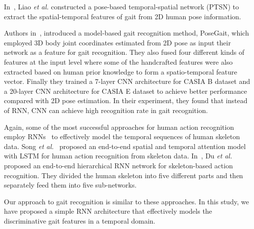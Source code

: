In~\cite{Liao_17}, Liao \textit{et al.} constructed a pose-based temporal-spatial network (PTSN) to extract the spatial-temporal features of gait from 2D human pose information. 

Authors in~\cite{Liao_19}, introduced a model-based gait recognition method, PoseGait, which employed 3D body joint coordinates estimated from 2D pose as input their network as a feature for gait recognition. They also fused four different kinds of features at the input level where some of the handcrafted features were also extracted based on human prior knowledge to form a spatio-temporal feature vector. Finally they trained a 7-layer CNN architecture for CASIA B dataset and a 20-layer CNN architecture for CASIA E dataset to achieve better performance compared with 2D pose estimation. In their experiment, they found that instead of RNN, CNN can achieve high recognition rate in gait recognition.

Again, some of the most successful approaches for human action recognition employ RNNs~\cite{Song_17, Du_15} to effectively model the temporal sequences of human skeleton data. Song \textit{et al.}~\cite{Song_17} proposed an end-to-end spatial and temporal attention model with LSTM for human action recognition from skeleton data. In~\cite{Du_15}, Du \textit{et al.} proposed an end-to-end hierarchical RNN network for skeleton-based action recognition. They divided the human skeleton into five different parts and then separately feed them into five sub-networks. 

Our approach to gait recognition is similar to these approaches. In this study, we have proposed a simple RNN architecture that effectively models the discriminative gait features in a temporal domain. 


